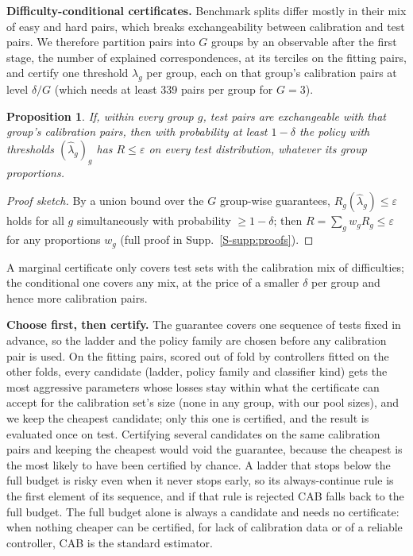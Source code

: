 \documentclass[10pt,twocolumn,letterpaper]{article}
\newtheorem{proposition}{Proposition}
\newcommand{\method}{CAB\xspace}
\newcommand{\paragraphb}[1]{\vspace{2pt}\noindent\textbf{#1}\hspace{0.4em}}
\newcommand{\suppref}[1]{Supp.~\ref{S-#1}}
\begin{document}
\paragraphb{Difficulty-conditional certificates.}
Benchmark splits differ mostly in their mix of easy and hard pairs, which breaks exchangeability between calibration and test pairs.
We therefore partition pairs into $G$ groups by an observable after the first stage, the number of explained correspondences, at its terciles on the fitting pairs, and certify one threshold $\lambda_g$ per group, each on that group's calibration pairs at level $\delta/G$ (which needs at least 339 pairs per group for $G=3$).
\begin{proposition}
\label{prop:groups}
If, within every group $g$, test pairs are exchangeable with that group's calibration pairs, then with probability at least $1-\delta$ the policy with thresholds $(\hat\lambda_g)_g$ has $R\le\varepsilon$ on every test distribution, whatever its group proportions.
\end{proposition}
\begin{proof}[Proof sketch]
By a union bound over the $G$ group-wise guarantees, $R_g(\hat\lambda_g)\le\varepsilon$ holds for all $g$ simultaneously with probability $\ge1-\delta$; then $R=\sum_g w_g R_g\le\varepsilon$ for any proportions $w_g$ (full proof in \suppref{supp:proofs}).
\end{proof}
A marginal certificate only covers test sets with the calibration mix of difficulties; the conditional one covers any mix, at the price of a smaller $\delta$ per group and hence more calibration pairs.

\paragraphb{Choose first, then certify.}
The guarantee covers one sequence of tests fixed in advance, so the ladder and the policy family are chosen before any calibration pair is used.
On the fitting pairs, scored out of fold by controllers fitted on the other folds, every candidate (ladder, policy family and classifier kind) gets the most aggressive parameters whose losses stay within what the certificate can accept for the calibration set's size (none in any group, with our pool sizes), and we keep the cheapest candidate; only this one is certified, and the result is evaluated once on test.
Certifying several candidates on the same calibration pairs and keeping the cheapest would void the guarantee, because the cheapest is the most likely to have been certified by chance.
A ladder that stops below the full budget is risky even when it never stops early, so its always-continue rule is the first element of its sequence, and if that rule is rejected \method falls back to the full budget.
The full budget alone is always a candidate and needs no certificate: when nothing cheaper can be certified, for lack of calibration data or of a reliable controller, \method is the standard estimator.
\end{document}

